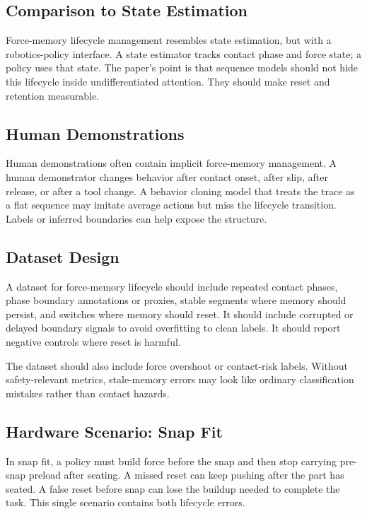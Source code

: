 \documentclass{article}
\begin{document}
\subsection{Comparison to State Estimation}

Force-memory lifecycle management resembles state estimation, but with a
robotics-policy interface. A state estimator tracks contact phase and force
state; a policy uses that state. The paper's point is that sequence models
should not hide this lifecycle inside undifferentiated attention. They should
make reset and retention measurable.

\subsection{Human Demonstrations}

Human demonstrations often contain implicit force-memory management. A human
demonstrator changes behavior after contact onset, after slip, after release,
or after a tool change. A behavior cloning model that treats the trace as a flat
sequence may imitate average actions but miss the lifecycle transition. Labels
or inferred boundaries can help expose the structure.

\subsection{Dataset Design}

A dataset for force-memory lifecycle should include repeated contact phases,
phase boundary annotations or proxies, stable segments where memory should
persist, and switches where memory should reset. It should include corrupted or
delayed boundary signals to avoid overfitting to clean labels. It should report
negative controls where reset is harmful.

The dataset should also include force overshoot or contact-risk labels. Without
safety-relevant metrics, stale-memory errors may look like ordinary
classification mistakes rather than contact hazards.

\subsection{Hardware Scenario: Snap Fit}

In snap fit, a policy must build force before the snap and then stop carrying
pre-snap preload after seating. A missed reset can keep pushing after the part
has seated. A false reset before snap can lose the buildup needed to complete
the task. This single scenario contains both lifecycle errors.
\end{document}
